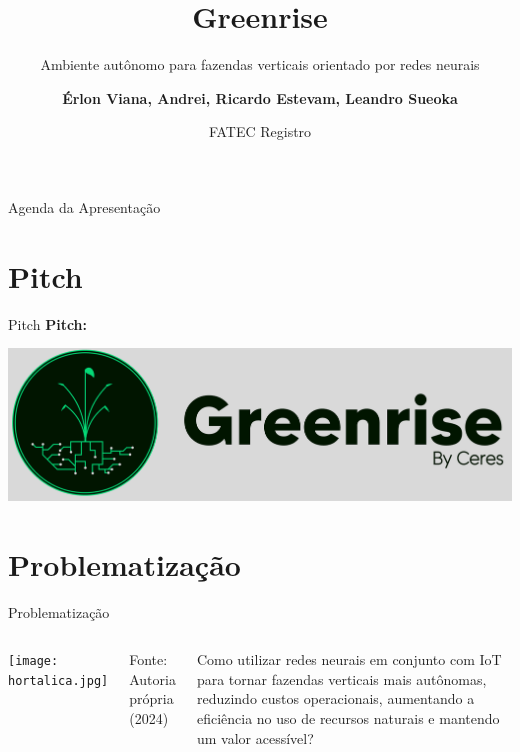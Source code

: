 \documentclass[10pt]{beamer}
\title[Greenrise]{Greenrise}  %
\subtitle{Ambiente autônomo para fazendas verticais orientado por redes neurais}
\author[Seu Nome]{\textbf{Érlon Viana, Andrei, Ricardo Estevam, Leandro Sueoka}}
\institute[Centro Paula Souza]{Centro Paula Souza}
\date{FATEC Registro}
\begin{document}
\begin{frame}[plain]
  \titlepage
\end{frame}

\begin{frame}{Agenda da Apresentação} 
    \tableofcontents
\end{frame}

\section{Pitch}
\begin{frame}{Pitch}
\centering
{\color{black}\bfseries\LARGE Pitch:}

\vspace{0.5cm}
\includegraphics[width=0.7\linewidth]{LOGOMARCA.png}
\end{frame}

\section{Problematização}
\begin{frame}{Problematização}

\begin{columns}[T,onlytextwidth]
    \centering
    \texttt{[image: hortalica.jpg]}
    
    \vspace{0.1cm}
    {\footnotesize
    \textcolor{cpspreto}{Fonte: Autoria própria (2024)}
    }
    
    \raggedright
    \hspace{0.8cm}\begin{minipage}{0.85\linewidth}
    {\small\textcolor{cpspreto}{Como utilizar redes neurais em conjunto com IoT para tornar fazendas verticais mais autônomas, reduzindo custos operacionais, aumentando a eficiência no uso de recursos naturais e mantendo um valor acessível?}}
    \end{minipage}

\end{columns}

\end{frame}
\end{document}
